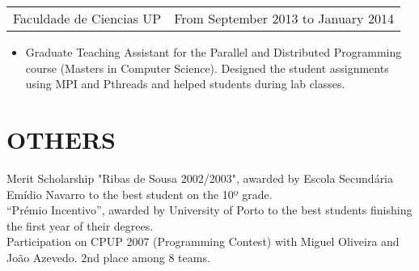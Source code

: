 \documentclass[margin]{res}
\begin{document}
\begin{resume}
                  \begin{tabular}{p{3in} r} %
                    Faculdade de Ciencias UP &  From September 2013 to January 2014
                   \end{tabular}
                    \begin{itemize}					        
                     \item[] Graduate Teaching Assistant for the Parallel and Distributed Programming course (Masters in Computer Science). Designed the student assignments using MPI and Pthreads and helped students during lab classes.
                    \end{itemize}

\section{OTHERS} Merit Scholarship "Ribas de Sousa 2002/2003", awarded by Escola Secundária Emídio Navarro to the best student on the 10º grade. \\
                  “Prémio Incentivo”, awarded by University of Porto to the best students finishing the first year of their degrees. \\
                  Participation on CPUP 2007 (Programming Contest) with Miguel Oliveira and João Azevedo. 2nd place among 8 teams. \\
                  

\end{resume}
\end{document}
